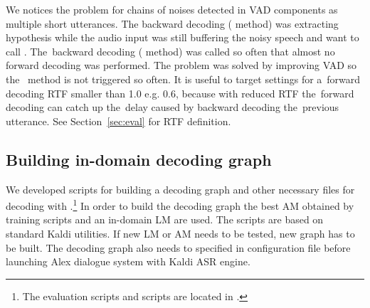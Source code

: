 
We notices the problem for chains of noises detected in \ac{VAD} components as multiple short utterances.
The backward decoding ( method) was extracting hypothesis while the audio input was still buffering the noisy speech and want to call .
The~backward decoding ( method) was called so often that almost no forward decoding was performed.
The problem was solved by improving \ac{VAD} so the~ method is not triggered so often.
It is useful to target settings for a~forward decoding \ac{RTF} smaller than 1.0 e.g. 0.6, because with reduced RTF the~forward decoding can catch up the~delay caused by backward decoding the~previous utterance.
See Section~\ref{sec:eval} for \ac{RTF} definition.

\subsection{Building in-domain decoding graph}
\label{sub:hclg}
We developed scripts for building a decoding graph and other necessary files for decoding with .\footnote{The evaluation scripts and  scripts are located in .}
In order to build the decoding graph the best \ac{AM} obtained by training scripts  and an in-domain \ac{LM} are used.
The scripts are based on standard Kaldi utilities.
If new \ac{LM} or \ac{AM} needs to be tested, new  graph has to be built.
The decoding graph also needs to specified in configuration file before launching Alex dialogue system with Kaldi \ac{ASR} engine.

